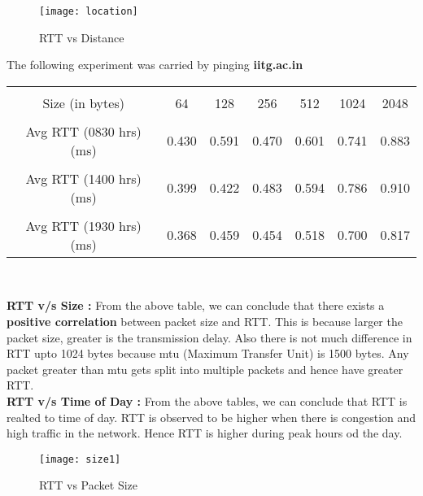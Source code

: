 \documentclass[12pt]{report}
\begin{document}
	\begin{figure}[H]
		\centering
		\texttt{[image: location]}
		\caption{RTT vs Distance}
	\end{figure}
	\pagebreak
	\vspace*{10px}
	\hspace*{1cm}The following experiment was carried by pinging \textbf{iitg.ac.in}\\[2pt]
	\begin{center}
	\begin{tabular}{| c | c | c | c | c | c | c |}
		\hline
		& & & & & &\\[1pt]
		Size (in bytes) & 64 & 128 & 256 & 512 & 1024 & 2048\\[1pt]
		\hline
		& & & & & &\\[1pt]
		Avg RTT (0830 hrs) (ms) & 0.430 & 0.591 & 0.470 & 0.601 & 0.741 & 0.883\\[1pt]
		\hline
		& & & & & &\\[1pt]
		Avg RTT (1400 hrs) (ms) & 0.399 & 0.422 & 0.483 & 0.594 & 0.786 & 0.910\\[1pt]
		\hline
		& & & & & &\\[1pt]
		Avg RTT (1930 hrs) (ms) & 0.368 & 0.459 & 0.454 & 0.518 & 0.700 & 0.817\\[1pt]
		\hline
	\end{tabular}
	\\[10pt]
	\end{center}
	\hspace*{1cm} \textbf{RTT v/s Size :} From the above table, we can conclude that there exists a \textbf{positive correlation} between packet size and RTT. This is because larger the packet size, greater is the transmission delay. Also there is not much difference in RTT upto 1024 bytes because mtu (Maximum Transfer Unit) is 1500 bytes. Any packet greater than mtu gets split into multiple packets and hence have greater RTT.	\\[1pt]
	\hspace*{1cm} \textbf{RTT v/s Time of Day :} From the above tables, we can conclude that RTT is realted to time of day. RTT is observed to be higher when there is congestion and high traffic in the network. Hence RTT is higher during peak hours od the day.\\[1pt]
	
	\begin{figure}[H]
		\centering
		\texttt{[image: size1]}
		\caption{RTT vs Packet Size}
	\end{figure}
\end{document}
